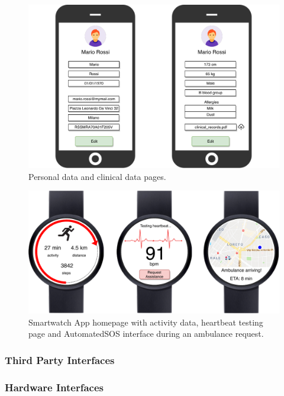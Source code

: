 \documentclass[12pt,a4paper]{article}
\begin{document}
		\begin{figure}[H]
			\centering
			\includegraphics[width=1.0\linewidth]{Images/data-pages}
			\caption{Personal data and clinical data pages.}
			\label{fig:data-pages}
		\end{figure}
		\begin{figure}[h]
			\centering
			\includegraphics[width=1.0\linewidth]{Images/smartwatch}
			\caption{Smartwatch App homepage with activity data, heartbeat testing page and AutomatedSOS interface during an ambulance request.}
			\label{fig:smartwatch}
		\end{figure}
	
	\newpage
	\subsubsection{Third Party Interfaces}
	
	\newpage
	\subsubsection{Hardware Interfaces}
	
\end{document}
